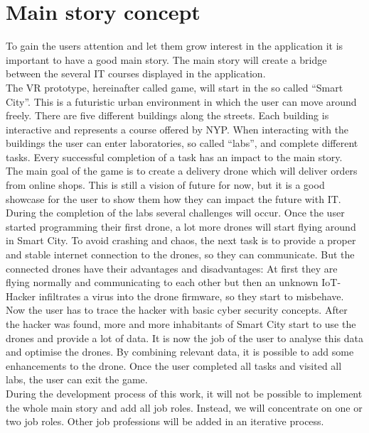 \section{Main story concept}
To gain the users attention and let them grow interest in the application it is important to have a good main story. The main story will create a bridge between the several IT courses displayed in the application.\\
The VR prototype, hereinafter called game, will start in the so called ``Smart City''. This is a futuristic urban environment in which the user can move around freely. There are five different buildings along the streets. Each building is interactive and represents a course offered by NYP. When interacting with the buildings the user can enter laboratories, so called ``labs'', and complete different tasks. Every successful completion of a task has an impact to the main story. \\
The main goal of the game is to create a delivery drone which will deliver orders from online shops. This is still a vision of future for now, but it is a good showcase for the user to show them how they can impact the future with IT. During the completion of the labs several challenges will occur. Once the user started programming their first drone, a lot more drones will start flying around in Smart City. To avoid crashing and chaos, the next task is to provide a proper and stable internet connection to the drones, so they can communicate. But the connected drones have their advantages and disadvantages: At first they are flying normally and communicating to each other but then an unknown IoT-Hacker infiltrates a virus into the drone firmware, so they start to misbehave. Now the user has to trace the hacker with basic cyber security concepts. After the hacker was found, more and more inhabitants of Smart City start to use the drones and provide a lot of data. It is now the job of the user to analyse this data and optimise the drones. By combining relevant data, it is possible to add some enhancements to the drone.
Once the user completed all tasks and visited all labs, the user can exit the game. \\
During the development process of this work, it will not be possible to implement the whole main story and add all job roles. Instead, we will concentrate on one or two job roles. Other job professions will be added in an iterative process.
\newpage
